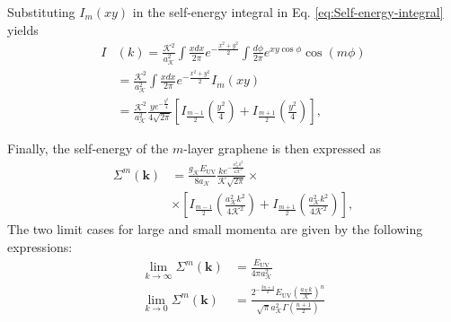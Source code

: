 \documentclass[english,aps,prd,nofootinbib,twocolumn]{revtex4-1}
\begin{document}
Substituting $I_{m}(xy)$ in the self-energy integral in Eq. \eqref{eq:Self-energy-integral} yields
\begin{equation}
\begin{split}
I&(k) =
\frac{\mathcal{K}^{2}}{a_{\mathcal{K}}^{2}}\!\!
\int \!\! \frac{x dx}{2\pi}
e^{-\tfrac{x^{2}+y^{2}}{2} } \!\!
\int \!\! \frac{d\phi }{2\pi}
e^{xy \cos \!\phi} 
\! \cos(m\phi) 
\\ &=
\frac{\mathcal{K}^{2}}{a_{\mathcal{K}}^{2}}\!\!
\int \!\! \frac{x dx}{2\pi}
e^{-\tfrac{x^{2}+y^{2}}{2} } \! I_{m}(xy)
\\ &=
\frac{\mathcal{K}^{2}}{a_{\mathcal{K}}^{2}}
\frac{y e^{-\frac{y^{2}}{4}}}{4\sqrt{2\pi}}
\left[ 
I_{\frac{m-1}{2}}\left(\frac{y^{2}}{4}\right) + 
I_{\frac{m+1}{2}}\left(\frac{y^{2}}{4}\right)
\right]
,
\end{split}
\end{equation}

Finally, the self-energy of the $m$-layer graphene is then expressed as
\begin{equation}
\begin{split}
\Sigma^{m}(\mathbf{k })
\! &= \!
\frac{g_{\mathcal{K}}E_{\mathrm{UV}}}{8a_{\mathcal{K}}}
\frac{k e^{-\frac{a_{\mathcal{K}}^{2}k^{2}}{4\mathcal{K}^{2}}}}{\mathcal{K}\sqrt{2\pi}}
 \times \\ &\times
\left[ 
I_{\frac{m-1}{2}}\!\!
\left(\frac{a_{\mathcal{K}}^{2}k^{2}}{4\mathcal{K}^{2}}\right)
\!\! + \!
I_{\frac{m+1}{2}}\!\!
\left(\frac{a_{\mathcal{K}}^{2}k^{2}}{4\mathcal{K}^{2}}\right)
\!
\right]
\!
,
\end{split}
\end{equation}
The two limit cases for large and small momenta are given by the following expressions:
\begin{equation}
\begin{split}
\lim_{k\rightarrow \infty} \Sigma^{m}(\mathbf{k }) &=
\frac{E_{\mathrm{UV}}}{4\pi a_{\mathcal{K}}^{2}} \\
\lim_{k\rightarrow 0} \Sigma^{m}(\mathbf{k }) &=
\frac{2^{-\frac{3n\!+\!4}{2}} E_{\mathrm{UV}} \left(\frac{a_{\mathcal{K}} k}{\mathcal{K}}\right)^n}{\sqrt{\pi } a_{\mathcal{K}}^2 \Gamma \left(\frac{n+1}{2}\right)}
\end{split}
\end{equation}
\end{document}
